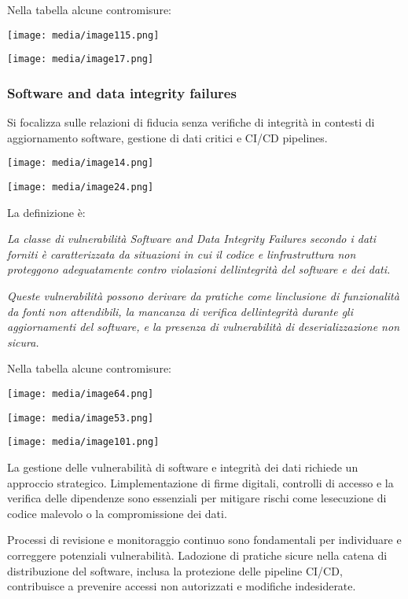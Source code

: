Nella tabella alcune contromisure:

\texttt{[image: media/image115.png]}

\texttt{[image: media/image17.png]}

\subsubsection{Software and data integrity
failures}\label{software-and-data-integrity-failures}

Si focalizza sulle relazioni di fiducia senza verifiche di integrità in
contesti di aggiornamento software, gestione di dati critici e CI/CD
pipelines.

\texttt{[image: media/image14.png]}

\texttt{[image: media/image24.png]}

La definizione è:

\emph{La classe di vulnerabilità Software and Data Integrity Failures
secondo i dati forniti è caratterizzata da situazioni in cui il codice e
l\textquotesingle infrastruttura non proteggono adeguatamente contro
violazioni dell\textquotesingle integrità del software e dei dati.}

\emph{Queste vulnerabilità possono derivare da pratiche come
l\textquotesingle inclusione di funzionalità da fonti non attendibili,
la mancanza di verifica dell\textquotesingle integrità durante gli
aggiornamenti del software, e la presenza di vulnerabilità di
deserializzazione non sicura.}

Nella tabella alcune contromisure:

\texttt{[image: media/image64.png]}

\texttt{[image: media/image53.png]}

\texttt{[image: media/image101.png]}

La gestione delle vulnerabilità di software e integrità dei dati
richiede un approccio strategico. L\textquotesingle implementazione di
firme digitali, controlli di accesso e la verifica delle dipendenze sono
essenziali per mitigare rischi come l\textquotesingle esecuzione di
codice malevolo o la compromissione dei dati.

Processi di revisione e monitoraggio continuo sono fondamentali per
individuare e correggere potenziali vulnerabilità.
L\textquotesingle adozione di pratiche sicure nella catena di
distribuzione del software, inclusa la protezione delle pipeline CI/CD,
contribuisce a prevenire accessi non autorizzati e modifiche
indesiderate.

